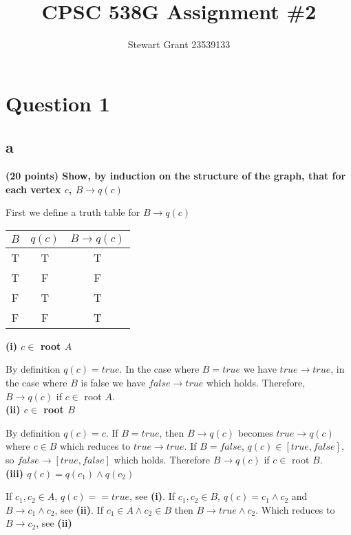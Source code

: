 \documentclass{article}
\author{Stewart Grant 23539133}
\title{CPSC 538G Assignment \#2}
\begin{document}
\maketitle
\tableofcontents
\newpage

\section{Question 1}
\subsection{a}
\textbf{(20 points) Show, by induction on the structure of the graph, that for each vertex $c$, $B\rightarrow q(c)$}

First we define a truth table for $B \rightarrow q(c)$ \\

\begin{tabular}{ c | c | c }
\hline
\textbf{$B$} & \textbf{$q(c)$} & \textbf{$B \rightarrow q(c)$} \\
\hline
\hline
T & T & T \\ \hline
T & F & F \\ \hline
F & T & T \\ \hline
F & F & T \\ \hline
\end{tabular}

\noindent\textbf{(i) $c \in $ root $A$}

By definition $q(c) = true$. In the case where $B = true$ we have
$true \rightarrow true$, in the case where $B$ is false we have $false
\rightarrow true$ which holds. Therefore, $B \rightarrow q(c)$ if $ c
\in $ root $A$.\\


\noindent\textbf{(ii) $c \in $ root $B$}

By definition $q(c) = c$. If $B = true$, then $B \rightarrow q(c)$
becomes $true \rightarrow q(c)$ where $c \in B$ which reduces to $true
\rightarrow true$. If $B = false$, $q(c) \in [true,false]$, so $false
\rightarrow [true,false]$ which holds. Therefore $B \rightarrow q(c)$
if $c \in$ root $B$.\\

\noindent\textbf{(iii) $q(c) = q(c_1) \wedge q(c_2)$}

If $c_1, c_2 \in A$, $q(c) == true$, see \textbf{(i)}. If $c_1, c_2
\in B$, $q(c) = c_1 \wedge c_2$ and $B \rightarrow c_1 \wedge c_2$,
see \textbf{(ii)}. If $c_1 \in A \wedge c_2 \in B$ then $B \rightarrow
true \wedge c_2$. Which reduces to $B \rightarrow c_2$, see
\textbf{(ii)}\\
\end{document}
